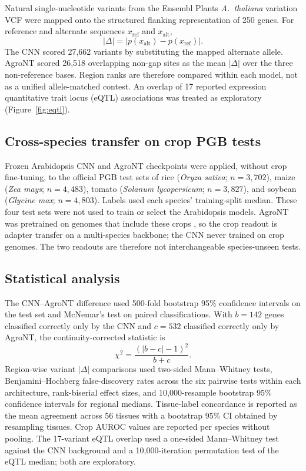 \documentclass[9pt,twocolumn,twoside,lineno]{gsag3jnl}
\begin{document}
Natural single-nucleotide variants from the Ensembl Plants \emph{A.\ thaliana} variation VCF \citep{harrison2024} were mapped onto the structured flanking representation of 250 genes. For reference and alternate sequences $x_{\mathrm{ref}}$ and $x_{\mathrm{alt}}$,
\begin{equation}
|\Delta|=\bigl|p(x_{\mathrm{alt}})-p(x_{\mathrm{ref}})\bigr|.
\label{eq:delta}
\end{equation}
The CNN scored 27,662 variants by substituting the mapped alternate allele. AgroNT scored 26,518 overlapping non-gap sites as the mean $|\Delta|$ over the three non-reference bases. Region ranks are therefore compared within each model, not as a unified allele-matched contest. An overlap of 17 reported expression quantitative trait locus (eQTL) associations was treated as exploratory (Figure~\ref{fig:eqtl}).

\subsection{Cross-species transfer on crop PGB tests}

Frozen Arabidopsis CNN and AgroNT checkpoints were applied, without crop fine-tuning, to the official PGB test sets of rice (\emph{Oryza sativa}; $n=3{,}702$), maize (\emph{Zea mays}; $n=4{,}483$), tomato (\emph{Solanum lycopersicum}; $n=3{,}827$), and soybean (\emph{Glycine max}; $n=4{,}803$). Labels used each species' training-split median. These four test sets were not used to train or select the Arabidopsis models. AgroNT was pretrained on genomes that include these crops \citep{mendoza2024}, so the crop readout is adapter transfer on a multi-species backbone; the CNN never trained on crop genomes. The two readouts are therefore not interchangeable species-unseen tests.

\subsection{Statistical analysis}

The CNN--AgroNT difference used 500-fold bootstrap 95\% confidence intervals on the test set and McNemar's test on paired classifications. With $b=142$ genes classified correctly only by the CNN and $c=532$ classified correctly only by AgroNT, the continuity-corrected statistic is
\begin{equation}
\chi^2=\frac{(|b-c|-1)^2}{b+c}.
\label{eq:mcnemar}
\end{equation}
Region-wise variant $|\Delta|$ comparisons used two-sided Mann--Whitney tests, Benjamini--Hochberg false-discovery rates across the six pairwise tests within each architecture, rank-biserial effect sizes, and 10{,}000-resample bootstrap 95\% confidence intervals for regional medians. Tissue-label concordance is reported as the mean agreement across 56 tissues with a bootstrap 95\% CI obtained by resampling tissues. Crop AUROC values are reported per species without pooling. The 17-variant eQTL overlap used a one-sided Mann--Whitney test against the CNN background and a 10{,}000-iteration permutation test of the eQTL median; both are exploratory.
\end{document}
